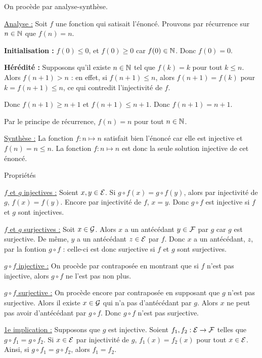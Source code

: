 \documentclass[]{../templates/homework}
\begin{document}
\subproblem
On procède par analyse-synthèse.

\underline{Analyse :} Soit $f$ une fonction qui satisait l'énoncé. Prouvons par récurrence sur $n\in\mathbb N$ que $f(n) = n$.

\textbf{Initialisation :} $f(0) \leq 0$, et $f(0) \geq 0$ car $f(0) \in \mathbb N$. Donc $f(0) = 0$.

\textbf{Hérédité :} Supposons qu'il existe $n\in\mathbb N$ tel que $f(k) = k$ pour tout $k \leq n$. Alors $f(n+1) > n$ : en effet, si $f(n+1) \leq n$, alors $f(n+1) = f(k)$ pour $k = f(n+1) \leq n$, ce qui contredit l'injectivité de $f$.

Donc $f(n+1) \geq n+1$ et $f(n+1) \leq n+1$. Donc $f(n+1) = n+1$.

Par le principe de récurrence, $f(n) = n$ pour tout $n\in\mathbb N$.

\underline{Synthèse :} La fonction $f:n\mapsto n$ satisfait bien l'énoncé car elle est injective et $f(n) = n \leq n$. La fonction $f:n \mapsto n$ est donc la seule solution injective de cet énoncé.


 {Propriétés}
\setcounter{subproblem}{0}
\subproblem
\question

\underline{$f$ et $g$ injectives :} Soient $x,y\in\mathcal E$. Si $g\circ f(x) = g\circ f(y)$, alors par injectivité de $g$, $f(x) = f(y)$. Encore par injectivité de $f$, $x = y$. Donc $g\circ f$ est injective si $f$ et $g$ sont injectives.

\underline{$f$ et $g$ surjectives :} Soit $x \in \mathcal G$. Alors $x$ a un antécédant $y\in\mathcal F$ par $g$ car $g$ est surjective. De même, $y$ a un antécédant $z\in\mathcal E$ par $f$. Donc $x$ a un antécédant, $z$, par la fontion $g\circ f$ : celle-ci est donc surjective si $f$ et $g$ sont surjectives.

\question

\underline{$g\circ f$ injective :} On procède par contraposée en montrant que si $f$ n'est pas injective, alors $g\circ f$ ne l'est pas non plus.

\vspace{2cm}

\underline{$g\circ f$ surjective :} On procède encore par contraposée en supposant que $g$ n'est pas surjective. Alors il existe $x\in\mathcal G$ qui n'a pas d'antécédant par $g$. Alors $x$ ne peut pas avoir d'antécédant par $g\circ f$. Donc $g\circ f$ n'est pas surjective.

\subproblem

\question
\underline{1e implication :} Supposons que $g$ est injective. Soient $f_{1},f_{2}:\mathcal E\rightarrow\mathcal F$ telles que $g\circ f_{1} = g\circ f_{2}$. Si $x\in\mathcal E$ par injectivité de $g$, $f_{1}(x) = f_{2}(x)$ pour tout $x\in\mathcal E$. Ainsi, si $g\circ f_{1} = g\circ f_{2}$, alors $f_{1} = f_{2}$.
\end{document}
